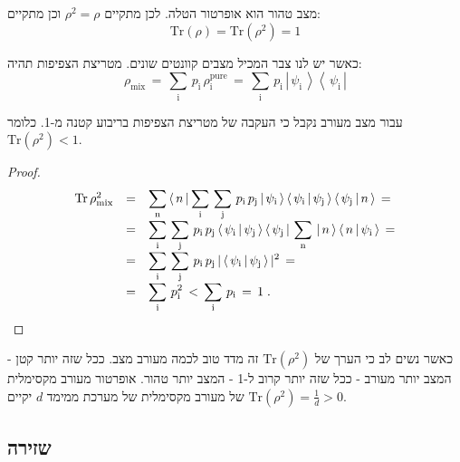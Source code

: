 \documentclass{tstextbook}
\begin{document}
\begin{proposition}
מצב טהור הוא אופרטור הטלה. לכן מתקיים \(\rho^{2}=\rho\) וכן מתקיים:
$$\mathrm{Tr}\left( \rho \right)=\mathrm{Tr}\left( \rho^{2} \right)=1$$

\end{proposition}
\begin{proposition}
כאשר יש לנו צבר המכיל מצבים קוונטים שונים. מטריצת הצפיפות תהיה:
$$\rho_{\mathrm{mix}}\,=\,\sum_{\mathrm{i}}\,p_{\mathrm{i}}\,\rho_{\mathrm{i}}^{\mathrm{pure}}\,=\,\sum_{\mathrm{i}}\,p_{\mathrm{i}}\,\left|\,\psi_{\mathrm{i}}\,\right>\left<\,\psi_{\mathrm{i}}\,\right|$$

\end{proposition}
\begin{proposition}
עבור מצב מעורב נקבל כי העקבה של מטריצת הצפיפות בריבוע קטנה מ-1. כלומר \(\mathrm{Tr}\left( \rho^{2} \right)<1\).

\end{proposition}
\begin{proof}
$$\begin{array}{r c l}{{\mathrm{Tr}\,\rho_{\mathrm{mix}}^{2}}}&{{=}}&{{\displaystyle\sum_{\mathrm{n}}\,\langle\,n\,|\sum_{\mathrm{i}}\,\sum_{\mathrm{j}}\,p_{\mathrm{i}}\,p_{\mathrm{j}}\,|\,\psi_{\mathrm{i}}\,\rangle\,\langle\,\psi_{\mathrm{i}}\,|\,\psi_{\mathrm{j}}\,\rangle\,\langle\,\psi_{\mathrm{j}}\,|\,n\,\rangle\,=}}\\ {{}}&{{=}}&{{\displaystyle\sum_{\mathrm{i}}\,\sum_{\mathrm{j}}\,p_{\mathrm{i}}\,p_{\mathrm{j}}\,\langle\,\psi_{\mathrm{i}}\,|\,\psi_{\mathrm{j}}\,\rangle\,\langle\,\psi_{\mathrm{j}}\,|\,\sum_{\mathrm{n}}\,|\,n\,\rangle\,\langle\,n\,|\,\psi_{\mathrm{i}}\,\rangle\,=}}\\ {{}}&{{=}}&{{\displaystyle\sum_{\mathrm{i}}\,\sum_{\mathrm{j}}\,p_{\mathrm{i}}\,p_{\mathrm{j}}\,|\,\langle\,\psi_{\mathrm{i}}\,|\,\psi_{\mathrm{j}}\,\rangle\,|^{2}\,=}}\\ {{}}&{{=}}&{{\displaystyle\sum_{\mathrm{i}}\,p_{\mathrm{i}}^{2}\,<\,\sum_{\mathrm{i}}\,p_{\mathrm{i}}\,=\,1\;.}}\end{array}$$

\end{proof}
כאשר נשים לב כי הערך של \(\mathrm{Tr}\left( \rho^{2} \right)\) זה מדד טוב לכמה מעורב מצב. ככל שזה יותר קטן - המצב יותר מעורב - ככל שזה יותר קרוב ל-1 - המצב יותר טהור. אופרטור מעורב מקסימלית של מעורב מקסימלית של מערכת ממימד \(d\) יקיים \(\mathrm{Tr}\left( \rho^{2} \right)=\frac{1}{d}>0\).

\subsection{שזירה}
\end{document}
